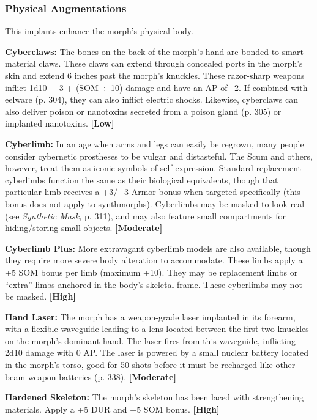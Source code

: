 \subsubsection{Physical Augmentations}

This implants enhance the morph's physical body.

\textbf{Cyberclaws: }The bones on the back of the morph's 
hand are bonded to smart material claws. These claws 
can extend through concealed ports in the morph's 
skin and extend 6 inches past the morph's knuckles. 
These razor-sharp weapons inflict 1d10 + 3 + (SOM 
÷ 10) damage and have an AP of –2. If combined 
with eelware (p. 304), they can also inflict  electric 
shocks. Likewise, cyberclaws can also deliver poison 
or nanotoxins secreted from a poison gland (p. 305) 
or implanted nanotoxins. \textbf{[Low]}

\textbf{Cyberlimb:} In an age when arms and legs can 
easily be regrown, many people consider cybernetic 
prostheses to be vulgar and distasteful. The Scum 
and others, however, treat them as iconic symbols 
of self-expression. Standard replacement cyberlimbs 
function the same as their biological equivalents, 
though that particular limb receives a +3/+3 Armor 
bonus when targeted specifically (this bonus does not 
apply to synthmorphs). Cyberlimbs may be masked 
to look real (see \textit{Synthetic Mask,} p. 311), and may 
also feature small compartments for hiding/storing 
small objects. \textbf{[Moderate]}

\textbf{Cyberlimb Plus:} More extravagant cyberlimb 
models are also available, though they require more 
severe body alteration to accommodate. These limbs 
apply a +5 SOM bonus per limb (maximum +10). 
They may be replacement limbs or ``extra'' limbs anchored
in the body's skeletal frame. These cyberlimbs
may not be masked. \textbf{[High]}

\textbf{Hand Laser: }The morph has a weapon-grade laser 
implanted in its forearm, with a flexible waveguide 
leading to a lens located between the first two knuckles
on the morph's dominant hand. The laser fires
from this waveguide, inflicting 2d10 damage with 0 
AP. The laser is powered by a small nuclear battery 
located in the morph's torso, good for 50 shots before 
it must be recharged like other beam weapon batteries 
(p. 338). \textbf{[Moderate]}

\textbf{Hardened Skeleton: }The morph's skeleton has been 
laced with strengthening materials. Apply a +5 DUR 
and +5 SOM bonus. \textbf{[High]}

